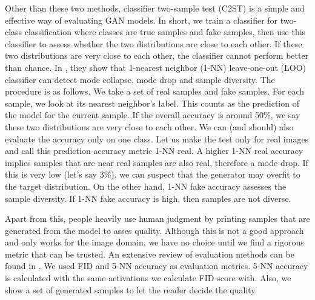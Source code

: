 \documentclass[a4paper,onesided,12pt]{report}
\begin{document}
Other than these two methods, classifier two-sample test (C2ST) \cite{twosample} is a simple and effective way of evaluating GAN models. In short, we train a classifier for two-class classification where classes are true samples and fake samples, then use this classifier to assess whether the two distributions are close to each other. If these two distributions are very close to each other, the classifier cannot perform better than chance. In \cite{xu2018empirical}, they show that 1-nearest neighbor (1-NN) leave-one-out (LOO) classifier can detect mode collapse, mode drop and sample diversity. The procedure is as follows. We take a set of real samples and fake samples. For each sample, we look at its nearest neighbor's label. This counts as the prediction of the model for the current sample. If the overall accuracy is around 50\%, we say these two distributions are very close to each other. We can (and should) also evaluate the accuracy only on one class. Let us make the test only for real images and call this prediction accuracy metric 1-NN real. A higher 1-NN real accuracy implies samples that are near real samples are also real, therefore a mode drop. If this is very low (let's say 3\%), we can suspect that the generator may overfit to the target distribution. On the other hand, 1-NN fake accuracy assesses the sample diversity. If 1-NN fake accuracy is high, then samples are not diverse. 

Apart from this, people heavily use human judgment by printing samples that are generated from the model to asses quality. Although this is not a good approach and only works for the image domain, we have no choice until we find a rigorous metric that can be trusted. An extensive review of evaluation methods can be found in \cite{evalreview}. We used FID and 5-NN accuracy as evaluation metrics. 5-NN accuracy is calculated with the same activations we calculate FID score with. Also, we show a set of generated samples to let the reader decide the quality.
\end{document}
